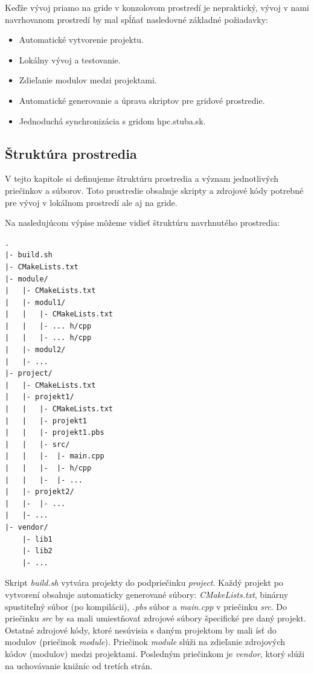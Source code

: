 Keďže vývoj priamo na gride v konzolovom prostredí je nepraktický, vývoj v nami navrhovanom prostredí by mal spĺňať nasledovné
základné požiadavky:
\begin{itemize}
\item
  Automatické vytvorenie projektu.
\item
  Lokálny vývoj a testovanie.
\item
  Zdieľanie modulov medzi projektami.
\item
  Automatické generovanie a úprava skriptov pre gridové prostredie.
\item
  Jednoduchá synchronizácia s gridom hpc.stuba.sk.
\end{itemize}

\subsection{Štruktúra prostredia}
V tejto kapitole si definujeme štruktúru prostredia a význam jednotlivých priečinkov a súborov.
Toto prostredie obsahuje skripty a zdrojové kódy potrebné pre vývoj v lokálnom prostredí ale aj na gride. 

Na nasledujúcom výpise môžeme vidieť štruktúru navrhnutého prostredia:
\begin{lstlisting}[caption={Štruktúra prostredia}, label={prop:struktura}]
.
|- build.sh
|- CMakeLists.txt
|- module/
|   |- CMakeLists.txt
|   |- modul1/
|   |   |- CMakeLists.txt
|   |   |- ... h/cpp
|   |   |- ... h/cpp
|   |- modul2/
|   |- ...
|- project/
|   |- CMakeLists.txt
|   |- projekt1/
|   |   |- CMakeLists.txt
|   |   |- projekt1
|   |   |- projekt1.pbs
|   |   |- src/
|   |   |-  |- main.cpp
|   |   |-  |- h/cpp
|   |   |-  |- ...
|   |- projekt2/
|   |-  |- ...
|   |- ...
|- vendor/
    |- lib1
    |- lib2
    |- ...
\end{lstlisting}

Skript \textit{build.sh} vytvára projekty do podpriečinku \textit{project}. Každý projekt po vytvorení obsahuje automaticky generované súbory:
\textit{CMakeLists.txt}, binárny spustiteľný súbor (po kompilácii), \textit{.pbs} súbor a \textit{main.cpp} v priečinku \textit{src}.
Do priečinku \textit{src} by sa mali umiestňovať zdrojové súbory špecifické pre daný projekt.
Ostatné zdrojové kódy, ktoré nesúvisia s daným projektom by mali ísť do modulov (priečinok \textit{module}).
Priečinok \textit{module} slúži na zdieľanie zdrojových kódov (modulov) medzi projektami.
Posledným priečinkom je \textit{vendor}, ktorý slúži na uchovávanie knižníc od tretích strán.
